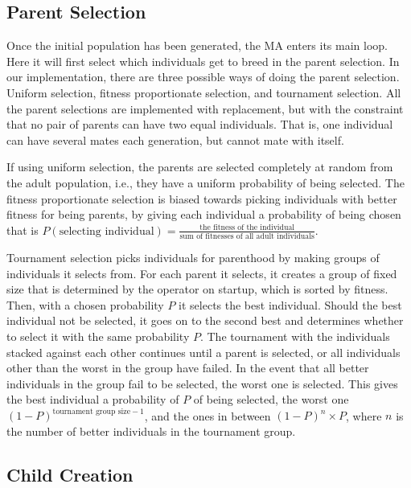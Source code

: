 \subsection{Parent Selection} %
\label{sub:achitecture_parent_selection}

Once the initial population has been generated, the MA enters its main loop. Here it will first select which individuals get to breed in the parent selection. In our implementation, there are three possible ways of doing the parent selection. Uniform selection, fitness proportionate selection, and tournament selection. All the parent selections are implemented with replacement, but with the constraint that no pair of parents can have two equal individuals. That is, one individual can have several mates each generation, but cannot mate with itself.

If using uniform selection, the parents are selected completely at random from the adult population, i.e., they have a uniform probability of being selected. The fitness proportionate selection is biased towards picking individuals with better fitness for being parents, by giving each individual a probability of being chosen that is $P(\text{selecting individual}) = \frac{\text{the fitness of the individual}}{\text{sum of fitnesses of all adult individuals}}$.

Tournament selection picks individuals for parenthood by making groups of individuals it selects from. For each parent it selects, it creates a group of fixed size that is determined by the operator on startup, which is sorted by fitness. Then, with a chosen probability $P$ it selects the best individual. Should the best individual not be selected, it goes on to the second best and determines whether to select it with the same probability $P$. The tournament with the individuals stacked against each other continues until a parent is selected, or all individuals other than the worst in the group have failed. In the event that all better individuals in the group fail to be selected, the worst one is selected. This gives the best individual a probability of $P$ of being selected, the worst one $(1-P)^{\text{tournament group size}-1}$, and the ones in between $(1-P)^{n} \times P$, where $n$ is the number of better individuals in the tournament group.


\subsection{Child Creation} %
\label{sub:achitecture_child_creation}

